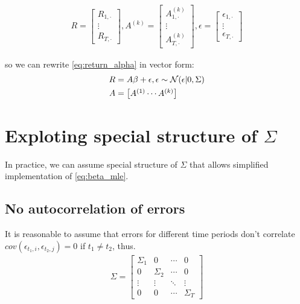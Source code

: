 \begin{align}
	\label{eq:stacked_variables}
	R = \begin{bmatrix}R_{1,\cdot} \\ \vdots \\  R_{T,\cdot}	\end{bmatrix},
	A^{(k)} = \begin{bmatrix}A^{(k)}_{1,\cdot} \\ \vdots \\  A^{(k)}_{T,\cdot}	\end{bmatrix},
	\epsilon = \begin{bmatrix}\epsilon_{1,\cdot} \\ \vdots \\  \epsilon_{T,\cdot}	\end{bmatrix}
\end{align}

so we can rewrite \autoref{eq:return_alpha} in vector form:
\begin{align}
	R &= A \beta + \epsilon, \epsilon \sim \mathcal{N}(\epsilon| 0, \Sigma) \\
	A &= \begin{bmatrix}
		A^{(1)} \cdots A^{(k)}
	\end{bmatrix}
\end{align}

\section{Exploting special structure of $\Sigma$}

In practice, we can assume special structure of $\Sigma$ that allows simplified implementation of \autoref{eq:beta_mle}. 

\subsection{No autocorrelation of errors}
It is reasonable to assume that errors for different time periods don't correlate $cov(\epsilon_{t_1, i}, \epsilon_{t_2, j})=0$ if $t_1 \neq t_2$, thus.
\begin{align}
	\Sigma =
	\begin{bmatrix}
		\Sigma_1 & 0 & \cdots & 0 \\
		0 & \Sigma_2 & \cdots & 0 \\
		\vdots & \vdots & \ddots & \vdots \\
		0 & 0 & \cdots & \Sigma_T
	\end{bmatrix}
	\label{eq:block_diagonal_sigma}
\end{align}

